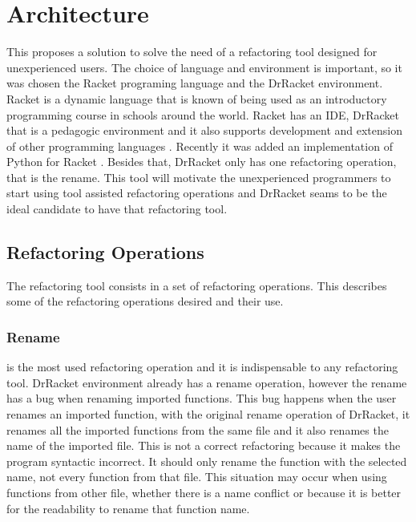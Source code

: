 
% 
% 

\section{Architecture}

This proposes a solution to solve the need of a refactoring tool designed for unexperienced users.
The choice of language and environment is important, so it was chosen the Racket programing language and the DrRacket environment.
Racket is a dynamic language that is known of being used as an introductory programming course in schools around the world. 
Racket has an IDE, DrRacket that is a pedagogic environment \cite{drscheme_pegadogy} and it also supports development and extension of other programming languages \cite{tobin2011languages}. Recently it was added an implementation of Python for Racket \cite{ramos2014implementation}.
Besides that, DrRacket only has one refactoring operation, that is the rename.
This tool will motivate the unexperienced programmers to start using tool assisted refactoring operations and DrRacket seams to be the ideal candidate to have that refactoring tool.


\subsection{Refactoring Operations}
The refactoring tool consists in a set of refactoring operations.
This describes some of the refactoring operations desired and their use.

\subsubsection{Rename}
\label{ssub:Rename}
is the most used refactoring operation and it is indispensable to any refactoring tool.
DrRacket environment already has a rename operation, however the rename has a bug when renaming imported functions.
This bug happens when the user renames an imported function, with the original rename operation of DrRacket, it renames all the imported functions from the same file and it also renames the name of the imported file.
This is not a correct refactoring because it makes the program syntactic incorrect. It should only rename the function with the selected name, not every function from that file.
This situation may occur when using functions from other file, whether there is a name conflict or because it is better for the readability to rename that function name.


